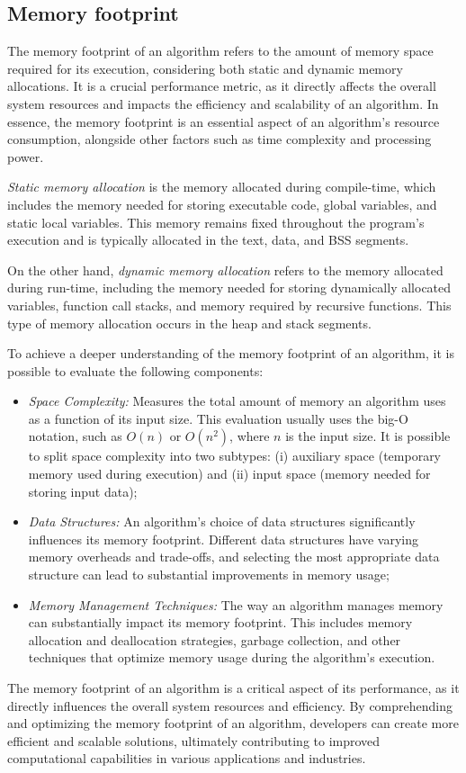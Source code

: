 \subsection{Memory footprint}
\label{subsec:memory-footprint}

The memory footprint of an algorithm refers to the amount of memory space required for its execution, considering both static and dynamic memory allocations.
It is a crucial performance metric, as it directly affects the overall system resources and impacts the efficiency and scalability of an algorithm.
In essence, the memory footprint is an essential aspect of an algorithm's resource consumption, alongside other factors such as time complexity and processing power.

\emph{Static memory allocation} is the memory allocated during compile-time, which includes the memory needed for storing executable code, global variables, and static local variables.
This memory remains fixed throughout the program's execution and is typically allocated in the text, data, and \ac{BSS} segments.

On the other hand, \emph{dynamic memory allocation} refers to the memory allocated during run-time, including the memory needed for storing dynamically allocated variables, function call stacks, and memory required by recursive functions.
This type of memory allocation occurs in the heap and stack segments.

To achieve a deeper understanding of the memory footprint of an algorithm, it is possible to evaluate the following components:

\begin{itemize}
    \item \emph{Space Complexity:} Measures the total amount of memory an algorithm uses as a function of its input size.
        This evaluation usually uses the big-O notation, such as $O(n)$ or $O(n^2)$, where $n$ is the input size.
        It is possible to split space complexity into two subtypes:
        (i) auxiliary space (temporary memory used during execution) and
        (ii) input space (memory needed for storing input data);
    \item \emph{Data Structures:} An algorithm's choice of data structures significantly influences its memory footprint.
        Different data structures have varying memory overheads and trade-offs, and selecting the most appropriate data structure can lead to substantial improvements in memory usage;
    \item \emph{Memory Management Techniques:} The way an algorithm manages memory can substantially impact its memory footprint.
        This includes memory allocation and deallocation strategies, garbage collection, and other techniques that optimize memory usage during the algorithm's execution.
\end{itemize}

The memory footprint of an algorithm is a critical aspect of its performance, as it directly influences the overall system resources and efficiency.
By comprehending and optimizing the memory footprint of an algorithm, developers can create more efficient and scalable solutions, ultimately contributing to improved computational capabilities in various applications and industries.
